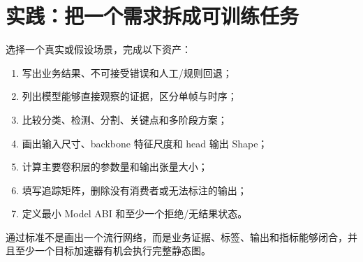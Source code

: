 \section{实践：把一个需求拆成可训练任务}

选择一个真实或假设场景，完成以下资产：

\begin{enumerate}
  \item 写出业务结果、不可接受错误和人工/规则回退；
  \item 列出模型能够直接观察的证据，区分单帧与时序；
  \item 比较分类、检测、分割、关键点和多阶段方案；
  \item 画出输入尺寸、backbone 特征尺度和 head 输出 Shape；
  \item 计算主要卷积层的参数量和输出张量大小；
  \item 填写追踪矩阵，删除没有消费者或无法标注的输出；
  \item 定义最小 Model ABI 和至少一个拒绝/无结果状态。
\end{enumerate}

通过标准不是画出一个流行网络，而是业务证据、标签、输出和指标能够闭合，并且至少一个目标加速器有机会执行完整静态图。
